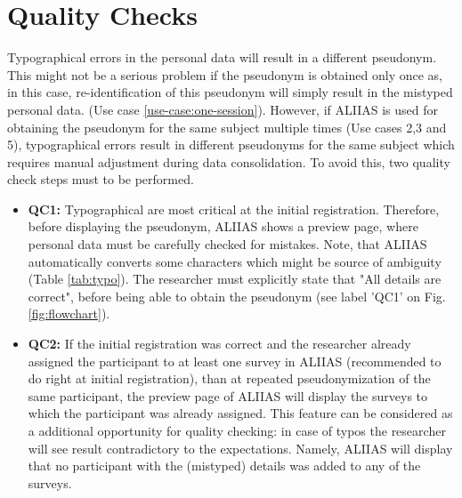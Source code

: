\section{Quality Checks}
\label{section:qc}
Typographical errors in the personal data will result in a different pseudonym. This might not be a serious problem if the pseudonym is obtained only once as, in this case, re-identification of this pseudonym will simply result in the mistyped personal data. (Use case \ref{use-case:one-session}).
However, if ALIIAS is used for obtaining the pseudonym for the same subject multiple times (Use cases 2,3 and 5), typographical errors result in different pseudonyms for the same subject which requires manual adjustment during data consolidation.
To avoid this, two quality check steps must to be performed.
\begin{itemize}
    \item \textbf{QC1:} Typographical are most critical at the initial registration. Therefore, before displaying the pseudonym, ALIIAS shows a preview page, where personal data must be carefully checked for mistakes. Note, that ALIIAS automatically converts some characters which might be source of ambiguity (Table \ref{tab:typo}). The researcher must explicitly state that "All details are correct", before being able to obtain the pseudonym (see label 'QC1' on Fig. \ref{fig:flowchart}).
    \item \textbf{QC2:} If the initial registration was correct and the researcher already assigned the participant to at least one survey in ALIIAS (recommended to do right at initial registration), than at repeated pseudonymization of the same participant, the preview page of ALIIAS will display the surveys to which the participant was already assigned. This feature can be considered as a additional opportunity for quality checking: in case of typos the researcher will see result contradictory to the expectations. Namely, ALIIAS will display that no participant with the (mistyped) details was added to any of the surveys.
\end{itemize}

